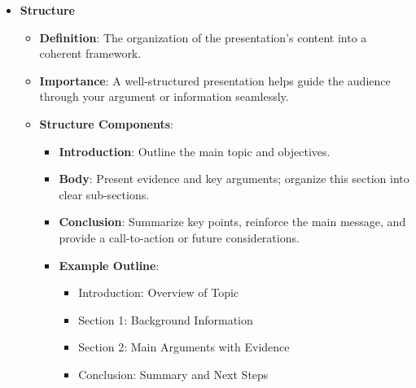 \documentclass[aspectratio=169]{beamer}
\begin{document}
\begin{frame}[fragile]
\begin{itemize}
        \item \textbf{Structure}
            \begin{itemize}
                \item \textbf{Definition}: The organization of the presentation’s content into a coherent framework.
                \item \textbf{Importance}: A well-structured presentation helps guide the audience through your argument or information seamlessly.
                \item \textbf{Structure Components}:
                    \begin{itemize}
                        \item \textbf{Introduction}: Outline the main topic and objectives.
                        \item \textbf{Body}: Present evidence and key arguments; organize this section into clear sub-sections.
                        \item \textbf{Conclusion}: Summarize key points, reinforce the main message, and provide a call-to-action or future considerations.
                        \item \textbf{Example Outline}:
                        \begin{itemize}
                            \item Introduction: Overview of Topic
                            \item Section 1: Background Information
                            \item Section 2: Main Arguments with Evidence
                            \item Conclusion: Summary and Next Steps
                        \end{itemize}
                    \end{itemize}
            \end{itemize}
    \end{itemize}
\end{frame}
\end{document}
